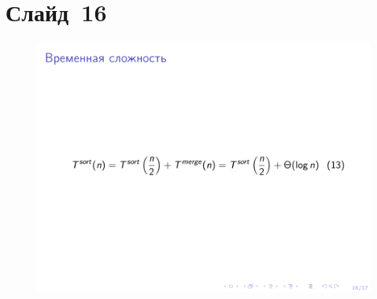 \documentclass[aps,pre,reprint]{revtex4-2}
\begin{document}
	\section{Слайд~16}
	\begin{figure}[H]
		\includegraphics[scale=.7]{presentation-16.png}
	\end{figure}
	
	
\end{document}
